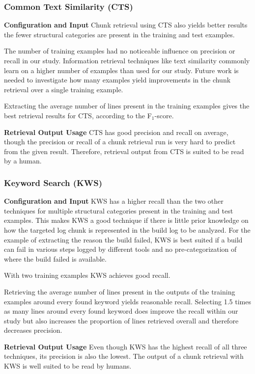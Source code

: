 \subsubsection{Common Text Similarity (CTS)}
\noindent
\textbf{Configuration and Input}
Chunk retrieval using CTS also yields better results the fewer structural categories are present in the training and test examples.

The number of training examples had no noticeable influence on precision or recall in our study.
Information retrieval techniques like text similarity commonly learn on a higher number of examples than used for our study.
Future work is needed to investigate how many examples yield improvements in the chunk retrieval over a single training example.

Extracting the average number of lines present in the training examples gives the best retrieval results for CTS, according to the F$_{1}$-score.

\noindent
\textbf{Retrieval Output Usage}
CTS has good precision and recall on average, though the precision or recall of a chunk retrieval run is very hard to predict from the given result.
Therefore, retrieval output from CTS is suited to be read by a human.

\subsubsection{Keyword Search (KWS)}
\noindent
\textbf{Configuration and Input}
KWS has a higher recall than the two other techniques for multiple structural categories present in the training and test examples.
This makes KWS a good technique if there is little prior knowledge on how the targeted log chunk is represented in the build log to be analyzed.
For the example of extracting the reason the build failed, KWS is best suited if a build can fail in various steps logged by different tools and no pre-categorization of where the build failed is available.

With two training examples KWS achieves good recall.

Retrieving the average number of lines present in the outputs of the training examples around every found keyword yields reasonable recall.
Selecting 1.5 times as many lines around every found keyword does improve the recall within our study but also increases the proportion of lines retrieved overall and therefore decreases precision.

\noindent
\textbf{Retrieval Output Usage}
Even though KWS has the highest recall of all three techniques, its precision is also the lowest.
The output of a chunk retrieval with KWS is well suited to be read by humans.

